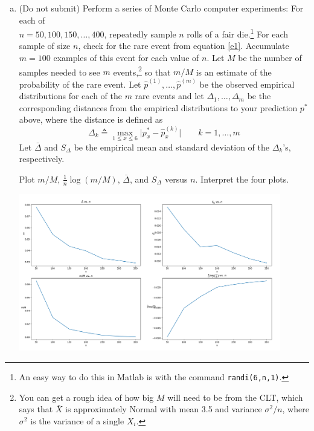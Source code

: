 \documentclass[11pt]{report}
\begin{document}
\begin{enumerate}[1.]
\begin{enumerate}[(a)]
              \item {\color{blue} (Do not submit)} Perform a series of Monte Carlo computer experiments: For each of \\$n=50,100,150,\dotsc,400$, repeatedly sample $n$ rolls of a fair die.\footnote{An easy way to do this in Matlab is with the command {\tt randi(6,n,1)}.}  For each sample of size $n$, check for the rare event from equation \eqref{e1}.  Accumulate $m=100$ examples of this event for each value of $n$.  Let $M$ be the number of samples needed to see $m$ events,\footnote{You can get a rough idea of how big $M$ will need to be from the CLT, which says that $\bar X$ is approximately Normal with mean 3.5 and variance $\sigma^2/n$, where $\sigma^2$ is the variance of a single $X_i$.} so that $m/M$ is an estimate of the probability of the rare event.  Let $\widehat p^{(1)},\dotsc,\widehat p^{(m)}$ be the observed empirical distributions for each of the $m$ rare events and let $\Delta_1,\dotsc,\Delta_m$ be the corresponding distances from the empirical distributions to your prediction $p^*$ above, where the distance is defined as
                        \[
                            \Delta_k \triangleq \max_{1\leq x \leq 6} \bigl|p_x^*-\widehat p_x^{(k)}\bigr| \qquad k=1,\ldots,m
                        \]
                        Let $\bar\Delta$ and $S_{\Delta}$ be the empirical mean and standard deviation of the $\Delta_k$'s, respectively.

                        Plot $m/M$, $\frac{1}{n}\log(m/M)$, $\bar\Delta$, and $S_{\Delta}$ versus $n$.  Interpret the four plots.

                    \color{blue}
                    \begin{center}
                        \includegraphics[width=0.9\textwidth]{1b.png}
                    \end{center}
                    \color{black}


\end{enumerate}
\end{enumerate}
\end{document}
